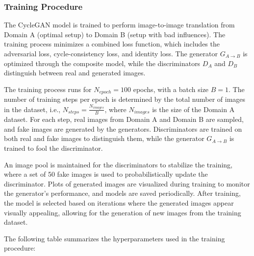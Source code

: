 \documentclass[12pt,DIV14,BCOR12mm,a4paper,footinclude=false,headinclude,parskip=half-,twoside,openright,cleardoublepage=empty,toc=index,bibliography=totoc,listof=totoc]{scrreprt}
\numberwithin{equation}{chapter}
\begin{document}
\subsubsection{Training Procedure}

The CycleGAN model is trained to perform image-to-image translation from Domain A (optimal setup) to Domain B (setup with bad influences). The training process minimizes a combined loss function, which includes the adversarial loss, cycle-consistency loss, and identity loss. The generator \( G_{A \to B} \) is optimized through the composite model, while the discriminators \( D_A \) and \( D_B \) distinguish between real and generated images.

The training process runs for \( N_{epoch} = 100 \) epochs, with a batch size \( B = 1 \). The number of training steps per epoch is determined by the total number of images in the dataset, i.e., \( N_{steps} = \frac{N_{images}}{B} \), where \( N_{images} \) is the size of the Domain A dataset. For each step, real images from Domain A and Domain B are sampled, and fake images are generated by the generators. Discriminators are trained on both real and fake images to distinguish them, while the generator \( G_{A \to B} \) is trained to fool the discriminator.

An image pool is maintained for the discriminators to stabilize the training, where a set of 50 fake images is used to probabilistically update the discriminator. Plots of generated images are visualized during training to monitor the generator's performance, and models are saved periodically. After training, the model is selected based on iterations where the generated images appear visually appealing, allowing for the generation of new images from the training dataset.

The following table summarizes the hyperparameters used in the training procedure:
\end{document}
